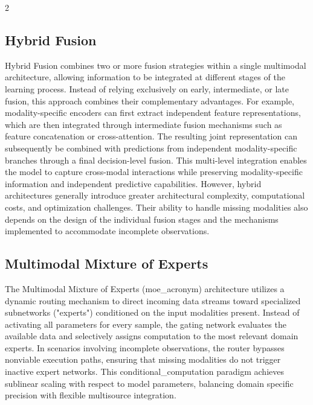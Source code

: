 \documentclass[10pt]{article}
\begin{document}
\begin{multicols}{2}
\subsection{Hybrid Fusion}
Hybrid Fusion combines two or more fusion strategies within a single multimodal architecture, 
allowing information to be integrated at different stages of the learning process. 
Instead of relying exclusively on early, 
intermediate, or late fusion, this approach combines their complementary advantages. 
For example, modality-specific encoders can first extract independent feature representations, 
which are then integrated through intermediate fusion mechanisms such as feature concatenation or cross-attention. 
The resulting joint representation can subsequently be combined with predictions from independent 
modality-specific branches through a final decision-level fusion. 
This multi-level integration enables the model to capture cross-modal interactions while 
preserving modality-specific information and independent predictive capabilities. 
However, hybrid architectures generally introduce greater architectural complexity, 
computational costs, and optimization challenges. 
Their ability to handle missing modalities also depends on the design of the individual 
fusion stages and the mechanisms implemented to accommodate incomplete observations.

\subsection{Multimodal Mixture of Experts}
The Multimodal Mixture of Experts 
(\gls{moe_acronym}) architecture utilizes a dynamic routing mechanism to direct incoming data streams toward specialized subnetworks 
("experts") conditioned on the input modalities present. Instead of activating all parameters for every sample, 
the gating network evaluates the available data and selectively assigns computation to the most relevant domain experts. 
In scenarios involving incomplete observations, 
the router bypasses nonviable execution paths, ensuring that missing modalities do not trigger inactive expert networks. 
This \gls{conditional_computation} paradigm achieves sublinear scaling with respect to model parameters, 
balancing domain specific precision with flexible multisource integration.



\end{multicols}
\end{document}
